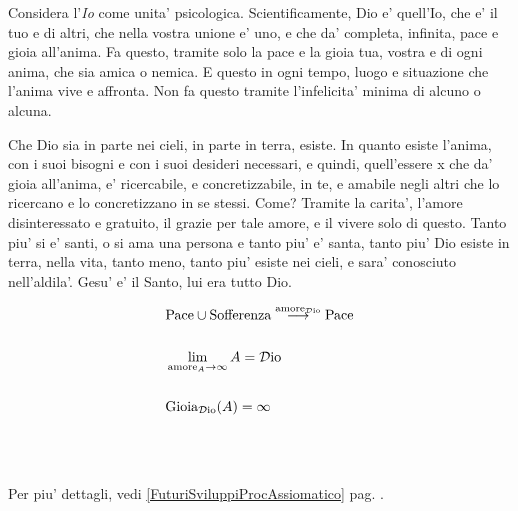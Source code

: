 \begin{vcentered}

    \label{DioScientificamentePoesia}

    Considera l'\emph{Io} come unita' psicologica. Scientificamente, Dio e' quell'Io, che e' il tuo e di altri, che nella vostra unione e' uno, e che da' completa, infinita, pace e gioia all'anima. Fa questo, tramite solo la pace e la gioia tua, vostra e di ogni anima, che sia amica o nemica. E questo in ogni tempo, luogo e situazione che l'anima vive e affronta. Non fa questo tramite l'infelicita' minima di alcuno o alcuna. 

Che Dio sia in parte nei cieli, in parte in terra, esiste. In quanto esiste l'anima, con i suoi bisogni e con i suoi desideri necessari, e quindi, quell'essere x che da' gioia all'anima, e' ricercabile, e concretizzabile, in te, e amabile negli altri che lo ricercano e lo concretizzano in se stessi. Come? Tramite la carita',  l'amore disinteressato e gratuito, il grazie per tale amore, e il vivere solo di questo. Tanto piu' si e' santi, o si ama una persona e tanto piu' e' santa, tanto piu' Dio esiste in terra, nella vita, tanto meno, tanto piu' esiste nei cieli, e sara' conosciuto nell'aldila'. Gesu' e' il Santo, lui era tutto Dio.

\end{vcentered}

\begin{vcentered}
    \begin{align*}
        &\textrm{Pace}\cup\textrm{Sofferenza} \stackrel{\textrm{amore}_{\mathcal{D}\textrm{io}}}{\longrightarrow} \textrm{Pace}\\
        &\qquad\\
        &\lim_{\textrm{amore}_A\to\infty}A = \mathcal{D}\textrm{io}\\
        &\qquad\\
        &\textrm{Gioia}_{\mathcal{D}\textrm{io}}(A) = \infty
    \end{align*}
\leavevmode\\
\leavevmode\\
\leavevmode\\
    Per piu' dettagli, vedi \ref{FuturiSviluppiProcAssiomatico} pag. \pageref{FuturiSviluppiProcAssiomatico}.
\end{vcentered}
